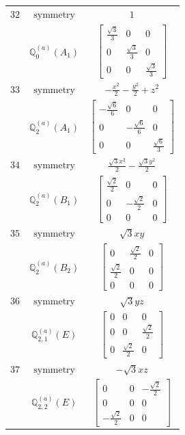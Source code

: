 \documentclass[fleqn,8pt,landscape]{jsarticle}
\begin{document}
\begin{longtable}{ccc}
$ 32 $ & $ \text{symmetry} $ & $ 1 $ \\
$  $ & $ \mathbb{Q}_{0}^{(a)}(A_{1}) $ & $ \begin{bmatrix} \frac{\sqrt{3}}{3} & 0 & 0 \\ 0 & \frac{\sqrt{3}}{3} & 0 \\ 0 & 0 & \frac{\sqrt{3}}{3} \end{bmatrix} $ \\ \hline
$ 33 $ & $ \text{symmetry} $ & $ - \frac{x^{2}}{2} - \frac{y^{2}}{2} + z^{2} $ \\
$  $ & $ \mathbb{Q}_{2}^{(a)}(A_{1}) $ & $ \begin{bmatrix} - \frac{\sqrt{6}}{6} & 0 & 0 \\ 0 & - \frac{\sqrt{6}}{6} & 0 \\ 0 & 0 & \frac{\sqrt{6}}{3} \end{bmatrix} $ \\ \hline
$ 34 $ & $ \text{symmetry} $ & $ \frac{\sqrt{3} x^{2}}{2} - \frac{\sqrt{3} y^{2}}{2} $ \\
$  $ & $ \mathbb{Q}_{2}^{(a)}(B_{1}) $ & $ \begin{bmatrix} \frac{\sqrt{2}}{2} & 0 & 0 \\ 0 & - \frac{\sqrt{2}}{2} & 0 \\ 0 & 0 & 0 \end{bmatrix} $ \\ \hline
$ 35 $ & $ \text{symmetry} $ & $ \sqrt{3} x y $ \\
$  $ & $ \mathbb{Q}_{2}^{(a)}(B_{2}) $ & $ \begin{bmatrix} 0 & \frac{\sqrt{2}}{2} & 0 \\ \frac{\sqrt{2}}{2} & 0 & 0 \\ 0 & 0 & 0 \end{bmatrix} $ \\ \hline
$ 36 $ & $ \text{symmetry} $ & $ \sqrt{3} y z $ \\
$  $ & $ \mathbb{Q}_{2,1}^{(a)}(E) $ & $ \begin{bmatrix} 0 & 0 & 0 \\ 0 & 0 & \frac{\sqrt{2}}{2} \\ 0 & \frac{\sqrt{2}}{2} & 0 \end{bmatrix} $ \\ \hline
$ 37 $ & $ \text{symmetry} $ & $ - \sqrt{3} x z $ \\
$  $ & $ \mathbb{Q}_{2,2}^{(a)}(E) $ & $ \begin{bmatrix} 0 & 0 & - \frac{\sqrt{2}}{2} \\ 0 & 0 & 0 \\ - \frac{\sqrt{2}}{2} & 0 & 0 \end{bmatrix} $ \\ \hline

\end{longtable}
\end{document}
